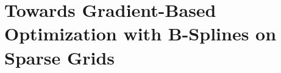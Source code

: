 
\chapter{Towards Gradient-Based Optimization with B-Splines on Sparse Grids}

\blindtext{}






\cleardoublepage
